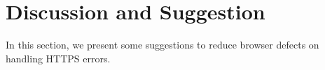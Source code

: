 %
%
%
%

\section{Discussion and Suggestion}

In this section,
    we present some suggestions to reduce browser defects on handling HTTPS errors.


